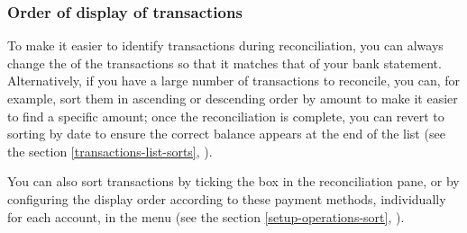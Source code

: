 \subsubsection{Order of display of transactions\label{reconciliation-account-description-sort}}

To make it easier to identify transactions during reconciliation, you can always change the  of the transactions so that it matches that of your bank statement. Alternatively, if you have a large number of transactions to reconcile, you can, for example, sort them in ascending or descending order by amount to make it easier to find a specific amount; once the reconciliation is complete, you can revert to sorting by date to ensure the correct balance appears at the end of the list (see the section \vref{transactions-list-sorts}, ).

You can also sort transactions by ticking the  box in the reconciliation pane, or by configuring the display order according to these payment methods, individually for each account, in the  menu (see the section \vref{setup-operations-sort}, ).

